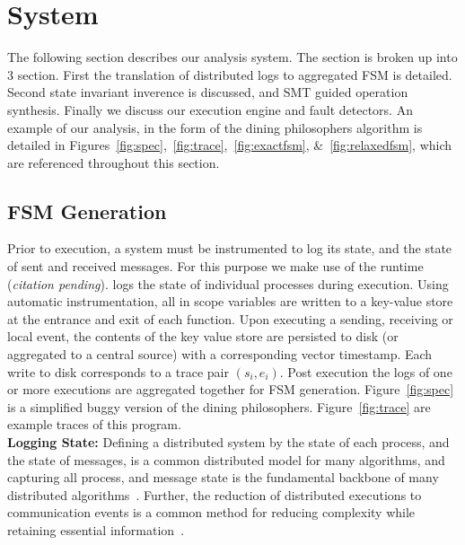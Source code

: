 \section{System}
\label{sec:system}

The following section describes our analysis system. The section is broken up
into 3 section. First the translation of distributed logs to aggregated FSM is
detailed. Second state invariant inverence is discussed, and SMT guided
operation synthesis. Finally we discuss our execution engine and fault
detectors. An example of our analysis, in the form of the dining philosophers
algorithm is detailed in
Figures~\ref{fig:spec},~\ref{fig:trace},~\ref{fig:exactfsm},
\&~\ref{fig:relaxedfsm}, which are referenced throughout this section.


\subsection{FSM Generation}

Prior to execution, a system must be instrumented to log its state, and the
state of sent and received messages. For this purpose we make use of the \dinv
runtime (\emph{citation pending}). \dinv logs the state of individual processes during
execution. Using automatic instrumentation, all in scope variables are written
to a key-value store at the entrance and exit of each function. Upon executing
a sending, receiving or local event, the contents of the key value store are
persisted to disk (or aggregated to a central source) with a corresponding
vector timestamp. Each write to disk corresponds to a trace pair $(s_i,e_i)$.
Post execution the logs of one or more executions are aggregated together for
FSM generation. Figure~\ref{fig:spec} is a simplified buggy version of the
dining philosophers. Figure~\ref{fig:trace} are example traces of this program.
\\

\noindent\textbf{Logging State:} Defining a distributed system by the state of
each process, and the state of messages, is a common distributed model for many
algorithms, and capturing all process, and message state is the fundamental
backbone of many distributed
algorithms~\cite{mattern_vector_clocks_1989,MATTERN1993423}.  Further, the
reduction of distributed executions to communication events is a common method
for reducing complexity while retaining essential
information~\cite{Fromentin:1995:OAD:213523.213533,BABAOGLU1995173,5727765,Hurfin:1998:EDD:286181.286G191,FROMENTIN1997522}.

